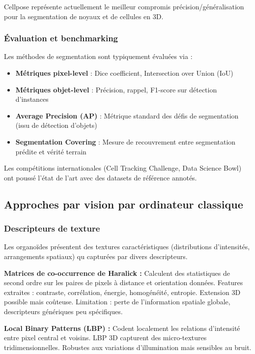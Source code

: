 Cellpose représente actuellement le meilleur compromis précision/généralisation pour la segmentation de noyaux et de cellules en 3D.

\subsubsection{Évaluation et benchmarking}

Les méthodes de segmentation sont typiquement évaluées via :
\begin{itemize}
    \item \textbf{Métriques pixel-level} : Dice coefficient, Intersection over Union (IoU)
    \item \textbf{Métriques objet-level} : Précision, rappel, F1-score sur détection d'instances
    \item \textbf{Average Precision (AP)} : Métrique standard des défis de segmentation (issu de détection d'objets)
    \item \textbf{Segmentation Covering} : Mesure de recouvrement entre segmentation prédite et vérité terrain
\end{itemize}

Les compétitions internationales (Cell Tracking Challenge, Data Science Bowl) ont poussé l'état de l'art avec des datasets de référence annotés.

\subsection{Approches par vision par ordinateur classique}

\subsubsection{Descripteurs de texture}

Les organoïdes présentent des textures caractéristiques (distributions d'intensités, arrangements spatiaux) qu capturées par divers descripteurs.

\textbf{Matrices de co-occurrence de Haralick :}
Calculent des statistiques de second ordre sur les paires de pixels à distance et orientation données. Features extraites : contraste, corrélation, énergie, homogénéité, entropie. Extension 3D possible mais coûteuse. Limitation : perte de l'information spatiale globale, descripteurs génériques peu spécifiques.

\textbf{Local Binary Patterns (LBP) :}
Codent localement les relations d'intensité entre pixel central et voisins. LBP 3D capturent des micro-textures tridimensionnelles. Robustes aux variations d'illumination mais sensibles au bruit.

